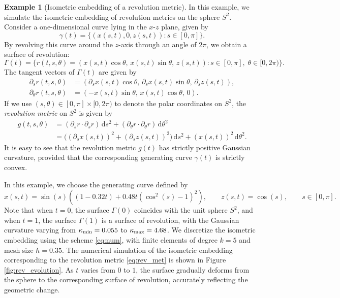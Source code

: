 \documentclass[11pt,a4paper,oneside,reqno]{amsart}
\theoremstyle{definition}
\newtheorem{example}{Example}[section]
\theoremstyle{plain}
\numberwithin{theorem}{section}
\numberwithin{proposition}{section}
\numberwithin{lemma}{section}
\numberwithin{equation}{section}
\begin{document}
\begin{example}[Isometric embedding of a revolution metric]

In this example, we simulate the isometric embedding of revolution metrics on the sphere \( S^2 \). 
Consider a one-dimensional curve lying in the \( x \)-\( z \) plane, given by
\[
    \gamma(t) = \{ (x(s,t), 0, z(s,t)) : s \in [0,\pi] \}.
\]
By revolving this curve around the \( z \)-axis through an angle of \( 2\pi \), we obtain a surface of revolution:
\[
    \Gamma(t) = \{ r(t,s,\theta) = (x(s,t)\cos\theta,\, x(s,t)\sin\theta,\, z(s,t)) : 
    s \in [0,\pi],\; \theta \in [0,2\pi) \}.
\]
The tangent vectors of \( \Gamma(t) \) are given by
\[
\begin{aligned}
    \partial_s r(t,s,\theta) &= (\partial_s x(s,t)\cos\theta,\, \partial_s x(s,t)\sin\theta,\, \partial_s z(s,t)), \\
    \partial_\theta r(t,s,\theta) &= (-x(s,t)\sin\theta,\, x(s,t)\cos\theta,\, 0).
\end{aligned}
\]
If we use \( (s, \theta) \in [0, \pi] \times [0, 2\pi) \) to denote the polar coordinates on \( S^2 \), the \emph{revolution metric} on \( S^2 \) is given by
\begin{equation}\label{eq:rev_met}
\begin{aligned}
    g(t,s,\theta) 
    &= (\partial_s r \cdot \partial_s r)\, \mathrm{d}s^2 
     + (\partial_\theta r \cdot \partial_\theta r)\, \mathrm{d}\theta^2 \\
    &= \big((\partial_s x(s,t))^2 + (\partial_s z(s,t))^2\big)\, \mathrm{d}s^2
     + (x(s,t))^2\, \mathrm{d}\theta^2.
\end{aligned}
\end{equation}
It is easy to see that the revolution metric \( g(t) \) has strictly positive Gaussian curvature, provided that the corresponding generating curve \( \gamma(t) \) is strictly convex.

In this example, we choose the generating curve defined by
\[
    x(s,t) = \sin(s)\left( (1 - 0.32t) + 0.48t( \cos^2(s) - 1 )^2 \right),
    \qquad
    z(s,t) = \cos(s),
    \qquad s \in [0,\pi].
\]
Note that when \( t = 0 \), the surface \( \Gamma(0) \) coincides with the unit sphere \( S^2 \), and when \( t = 1 \), the surface \( \Gamma(1) \) is a surface of revolution, with the Gaussian curvature varying from \( \kappa_{\rm min} = 0.055 \) to \( \kappa_{\rm max} = 4.68 \).
We discretize the isometric embedding using the scheme \eqref{eq:num}, with finite elements of degree \( k = 5 \) and mesh size \( h = 0.35 \).
The numerical simulation of the isometric embedding corresponding to the revolution metric \eqref{eq:rev_met} is shown in Figure \ref{fig:rev_evolution}.
As \( t \) varies from \( 0 \) to \( 1 \), the surface gradually deforms from the sphere to the corresponding surface of revolution, accurately reflecting the geometric change.



\end{example}
\end{document}
